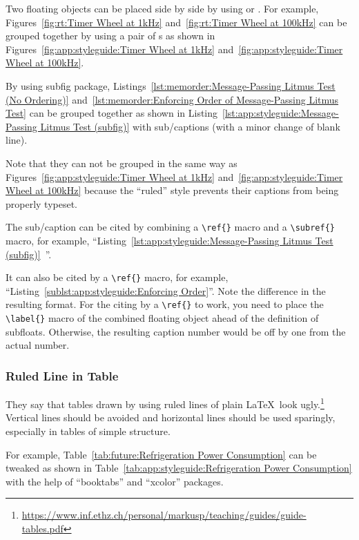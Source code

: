 Two floating objects can be placed side by side by using
\co{\\parbox} or .
For example,
Figures~\ref{fig:rt:Timer Wheel at 1kHz}
and~\ref{fig:rt:Timer Wheel at 100kHz}
can be grouped together by using a pair of s
as shown in
Figures~\ref{fig:app:styleguide:Timer Wheel at 1kHz}
and~\ref{fig:app:styleguide:Timer Wheel at 100kHz}.

By using subfig package,
Listings~\ref{lst:memorder:Message-Passing Litmus Test (No Ordering)}
and~\ref{lst:memorder:Enforcing Order of Message-Passing Litmus Test}
can be grouped together as shown in
Listing~\ref{lst:app:styleguide:Message-Passing Litmus Test (subfig)}
with sub\-/captions (with a minor change of blank line).

Note that they can not be grouped in the same way as
Figures~\ref{fig:app:styleguide:Timer Wheel at 1kHz}
and~\ref{fig:app:styleguide:Timer Wheel at 100kHz}
because the ``ruled'' style prevents their captions
from being properly typeset.

The sub\-/caption can be cited by combining a \verb|\ref{}| macro
and a \verb|\subref{}| macro, for example,
``Listing~\ref{lst:app:styleguide:Message-Passing Litmus Test (subfig)}\,%
''.

It can also be cited by a \verb|\ref{}| macro, for example,
``Listing~\ref{sublst:app:styleguide:Enforcing Order}''.
Note the difference in the resulting format. For the citing by
a \verb|\ref{}| to work, you need to place the \verb|\label{}|
macro of the combined floating object ahead of the definition of
subfloats.
Otherwise, the resulting caption number would be off by one
from the actual number.

\subsubsection{Ruled Line in Table}
\label{sec:app:styleguide:Ruled Line in Table}

They say that tables drawn by using ruled lines of plain \LaTeX\
look ugly.\footnote{
  \url{https://www.inf.ethz.ch/personal/markusp/teaching/guides/guide-tables.pdf}
}
Vertical lines should be avoided and horizontal lines should be
used sparingly, especially in tables of simple structure.

\captionsetup[table]{position=top,hangindent=30pt}
\renewcommand*{\abovetopsep}{-7pt}

For example,
Table~\ref{tab:future:Refrigeration Power Consumption}
can be tweaked as shown in
Table~\ref{tab:app:styleguide:Refrigeration Power Consumption}
with the help of ``booktabs'' and ``xcolor'' packages.

